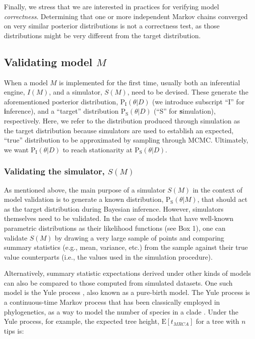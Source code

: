 \documentclass[oneside]{article}
\begin{document}
Finally, we stress that we are interested in practices for verifying model
\emph{correctness}.
Determining that one or more independent Markov chains converged on very
similar posterior distributions is not a correctness test, as those
distributions might be very different from the target distribution.

\subsection*{Validating model $M$}

When a model $M$ is implemented for the first time, usually both an
inferential engine, $I(M)$, and a simulator, $S(M)$, need to be devised.
These generate the aforementioned posterior distribution,
$\text{P}_{\text{I}}(\theta|D)$ (we introduce subscript ``I'' for
\textbf{i}nference), and a ``target'' distribution $\text{P}_{\text{S}}(\theta|D)$ (``S''
for \textbf{s}imulation), respectively.
Here, we refer to the distribution produced through simulation as the
target distribution because simulators are used to establish an
expected, ``true'' distribution to be approximated by sampling through MCMC.
Ultimately, we want $\text{P}_{\text{I}}(\theta|D)$ to reach stationarity at
$\text{P}_{\text{S}}(\theta|D)$.

\subsubsection*{Validating the simulator, $S(M)$}\label{verify-correctness-of-simulator-implementation}

As mentioned above, the main purpose of a simulator $S(M)$ in the context of model
validation is to generate a known distribution,
$\text{P}_{\text{S}}(\theta|M)$, that should act as the target distribution during
Bayesian inference.
However, simulators themselves need to be validated.
In the case of models that have well-known parametric distributions as their
likelihood functions (see Box 1), one can validate $S(M)$ by
drawing a very large sample of points and comparing summary statistics
(e.g., mean, variance, etc.) from the sample against their true value counterparts (i.e., the
values used in the simulation procedure). 

Alternatively, summary statistic expectations derived under other kinds of models can also be compared
to those computed from simulated datasets.
One such model is the Yule process \citep{yule24}, also known as a pure-birth model.
The Yule process is a continuous-time Markov process that has been
classically employed in phylogenetics, as a way to model the number of
species in a clade \citep{yule24,aldous01}.
Under the Yule process, for example, the expected tree height,
$\text{E}[t_{MRCA}]$ for a tree with $n$ tips is:
\end{document}
